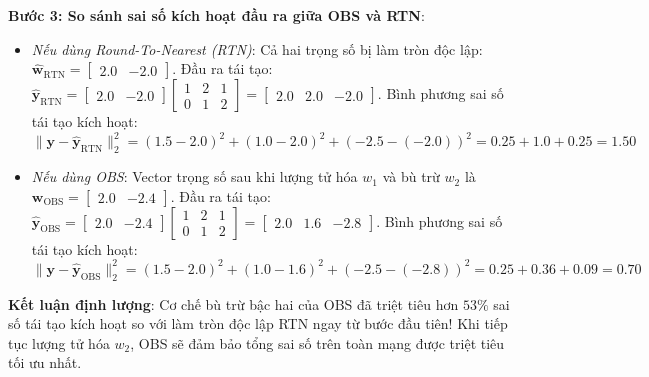 \begin{example}
\textbf{Bước 3: So sánh sai số kích hoạt đầu ra giữa OBS và RTN}:
\begin{itemize}
  \item \textit{Nếu dùng Round-To-Nearest (RTN)}: Cả hai trọng số bị làm tròn độc lập: $\widehat{\mathbf{w}}_{\text{RTN}} = \begin{bmatrix} 2.0 & -2.0 \end{bmatrix}$.
  Đầu ra tái tạo: $\widehat{\mathbf{y}}_{\text{RTN}} = \begin{bmatrix} 2.0 & -2.0 \end{bmatrix} \begin{bmatrix} 1 & 2 & 1 \\ 0 & 1 & 2 \end{bmatrix} = \begin{bmatrix} 2.0 & 2.0 & -2.0 \end{bmatrix}$.
  Bình phương sai số tái tạo kích hoạt:
  \begin{equation*}
  \|\mathbf{y} - \widehat{\mathbf{y}}_{\text{RTN}}\|_2^2 = (1.5 - 2.0)^2 + (1.0 - 2.0)^2 + (-2.5 - (-2.0))^2 = 0.25 + 1.0 + 0.25 = \mathbf{1.50}
  \end{equation*}
  \item \textit{Nếu dùng OBS}: Vector trọng số sau khi lượng tử hóa $w_1$ và bù trừ $w_2$ là $\mathbf{w}_{\text{OBS}} = \begin{bmatrix} 2.0 & -2.4 \end{bmatrix}$.
  Đầu ra tái tạo: $\widehat{\mathbf{y}}_{\text{OBS}} = \begin{bmatrix} 2.0 & -2.4 \end{bmatrix} \begin{bmatrix} 1 & 2 & 1 \\ 0 & 1 & 2 \end{bmatrix} = \begin{bmatrix} 2.0 & 1.6 & -2.8 \end{bmatrix}$.
  Bình phương sai số tái tạo kích hoạt:
  \begin{equation*}
  \|\mathbf{y} - \widehat{\mathbf{y}}_{\text{OBS}}\|_2^2 = (1.5 - 2.0)^2 + (1.0 - 1.6)^2 + (-2.5 - (-2.8))^2 = 0.25 + 0.36 + 0.09 = \mathbf{0.70}
  \end{equation*}
\end{itemize}
\textbf{Kết luận định lượng}: Cơ chế bù trừ bậc hai của OBS đã triệt tiêu hơn $53\%$ sai số tái tạo kích hoạt so với làm tròn độc lập RTN ngay từ bước đầu tiên! Khi tiếp tục lượng tử hóa $w_2$, OBS sẽ đảm bảo tổng sai số trên toàn mạng được triệt tiêu tối ưu nhất.
\end{example}

